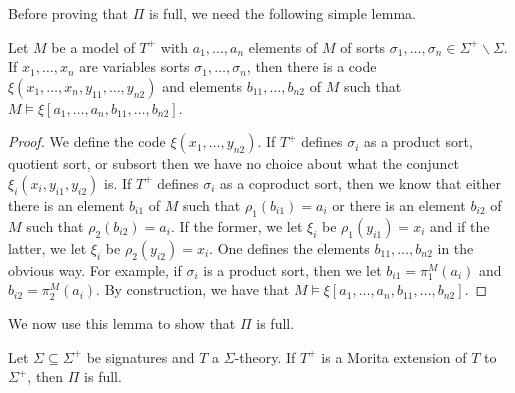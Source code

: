 Before proving that $\Pi$ is full, we need the following simple lemma.

\begin{lemma} Let $M$ be a model of $T^+$ with $a_1,\ldots, a_n$
  elements of $M$ of sorts
  $\sigma_1,\ldots, \sigma_n\in\Sigma^+\backslash\Sigma$. If
  $x_1,\ldots, x_n$ are variables sorts $\sigma_1,\ldots, \sigma_n$,
  then there is a code $\xi(x_1,\ldots, x_n, y_{11},\ldots, y_{n2})$
  and elements $b_{11},\ldots, b_{n2}$ of $M$ such that
  $M\vDash\xi[a_1,\ldots, a_n, b_{11},\ldots, b_{n2}]$.
\end{lemma}

\begin{proof} We define the code $\xi(x_1,\ldots, y_{n2})$. If $T^+$
  defines $\sigma_i$ as a product sort, quotient sort, or subsort then
  we have no choice about what the conjunct
  $\xi_i(x_i, y_{i1}, y_{i2})$ is. If $T^+$ defines $\sigma_i$ as a
  coproduct sort, then we know that either there is an element
  $b_{i1}$ of $M$ such that $\rho_1(b_{i1})=a_i$ or there is an
  element $b_{i2}$ of $M$ such that $\rho_2(b_{i2})=a_i$. If the
  former, we let $\xi_i$ be $\rho_1(y_{i1})=x_i$ and if the latter, we
  let $\xi_i$ be $\rho_2(y_{i2})=x_i$. One defines the elements
  $b_{11}, \ldots, b_{n2}$ in the obvious way. For example, if
  $\sigma_i$ is a product sort, then we let $b_{i1}=\pi_1^M(a_i)$ and
  $b_{i2}=\pi_2^M(a_i)$. By construction, we have that
  $M\vDash\xi[a_1,\ldots, a_n, b_{11},\ldots, b_{n2}]$.
\end{proof}

We now use this lemma to show that $\Pi$ is full.

\begin{prop} Let $\Sigma\subseteq\Sigma^+$ be signatures and $T$ a
  $\Sigma$-theory. If $T^+$ is a Morita extension of $T$ to
  $\Sigma^+$, then $\Pi$ is full.  \label{more3} \end{prop}

